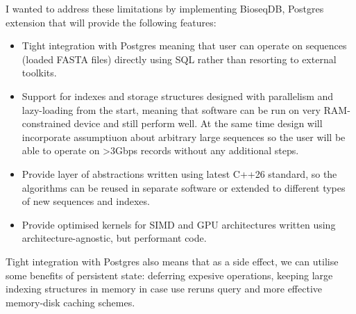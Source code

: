 I wanted to address these limitations by implementing BioseqDB, Postgres extension that will provide the following features:
\begin{itemize}
  \item Tight integration with Postgres meaning that user can operate on sequences (loaded FASTA files) directly using SQL rather than resorting to external toolkits.
  \item Support for indexes and storage structures designed with parallelism and lazy-loading from the start, meaning that software can be run on very RAM-constrained device and still perform well. At the same time design will incorporate assumptiuon about arbitrary large sequences so the user will be able to operate on >3Gbps records without any additional steps.
  \item Provide layer of abstractions written using latest C++26 standard, so the algorithms can be reused in separate software or extended to different types of new sequences and indexes.
  \item Provide optimised kernels for SIMD and GPU architectures written using architecture-agnostic, but performant code.
\end{itemize}

Tight integration with Postgres also means that as a side effect, we can utilise some benefits of persistent state: deferring expesive operations, keeping large indexing structures in memory in case use reruns query and more effective memory-disk caching schemes. 





